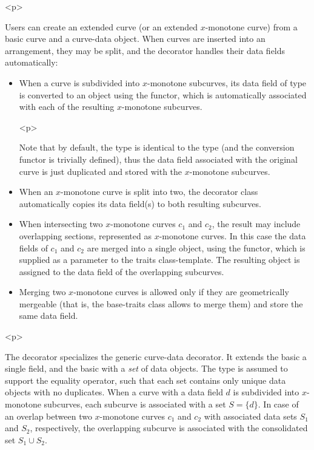 \begin{ccHtmlOnly}<p>\end{ccHtmlOnly}
Users can create an extended curve (or an extended $x$-monotone
curve) from a basic curve and a curve-data object. When curves are
inserted into an arrangement, they may be split, and the
decorator handles their data fields automatically:
\begin{itemize}
\item When a curve is subdivided into $x$-monotone subcurves, its
data field of type  is converted to an 
object using the  functor, which is automatically associated
with each of the resulting $x$-monotone subcurves.

\begin{ccHtmlOnly}<p>\end{ccHtmlOnly}
Note that by default, the  type is identical to the
 type (and the conversion functor 
is trivially defined), thus the data field associated with the original
curve is just duplicated and stored with the $x$-monotone subcurves.
%
\item When an $x$-monotone curve is split into two, the decorator
class automatically copies its data field(s) to both resulting
subcurves.
%
\item When intersecting two $x$-monotone curves $c_1$ and $c_2$, the
result may include overlapping sections, represented as
$x$-monotone curves. In this case the data fields of $c_1$ and $c_2$
are merged into a single  object,
using the  functor, which is supplied as a
parameter to the traits class-template. The resulting object is
assigned to the data field of the overlapping subcurves.
%
\item Merging two $x$-monotone curves is allowed only if they are
geometrically mergeable (that is, the base-traits class allows to merge
them) and store the same data field.
\end{itemize}

\begin{ccHtmlOnly}<p>\end{ccHtmlOnly}
The  decorator
specializes the generic curve-data decorator. It extends the basic
 a single  field, and the basic
 with a {\em set} of data objects.
The  type is assumed to support the equality operator, such that
each set contains only unique data objects with no duplicates.
When a curve with a data field $d$ is subdivided into $x$-monotone subcurves,
each subcurve is associated with a set $S = \{ d \}$. In case of an overlap
between two $x$-monotone curves $c_1$ and $c_2$ with associated data sets
$S_1$ and $S_2$, respectively, the overlapping subcurve is associated with
the consolidated set $S_1 \cup S_2$.

